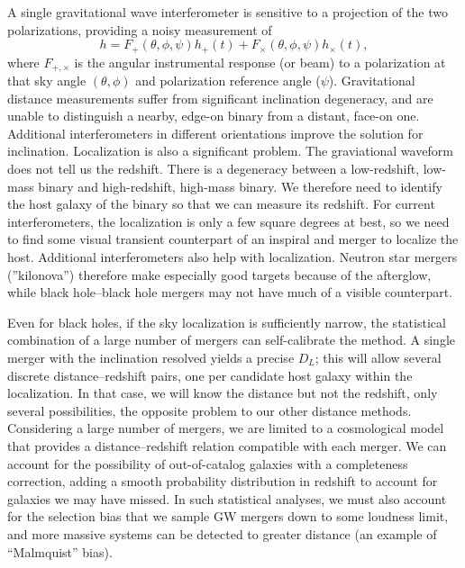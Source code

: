 A single gravitational wave interferometer is sensitive to a projection of the two polarizations, providing a noisy measurement of 
\begin{equation}
  h = F_+(\theta,\phi,\psi) h_+(t) + F_\times(\theta,\phi,\psi) h_\times(t),
\end{equation}
where $F_{+,\times}$ is the angular instrumental response (or beam) to a polarization at that sky angle $(\theta,\phi)$ and polarization reference angle ($\psi$).  Gravitational distance measurements suffer from significant inclination degeneracy, and are unable to distinguish a nearby, edge-on binary from a distant, face-on one.  Additional interferometers in different orientations improve the solution for inclination.   Localization is also a significant problem.  The graviational waveform does not tell us the redshift.  There is a degeneracy between a low-redshift, low-mass binary and high-redshift, high-mass binary.  We therefore need to identify the host galaxy of the binary so that we can measure its redshift.  For current interferometers, the localization is only a few square degrees at best, so we need to find some visual transient counterpart of an inspiral and merger to localize the host.  Additional interferometers also help with localization.  Neutron star mergers (''kilonova'') therefore make especially good targets because of the afterglow, while black hole--black hole mergers may not have much of a visible counterpart.

Even for black holes, if the sky localization is sufficiently narrow, the statistical combination of a large number of mergers can self-calibrate the method.  A single merger with the inclination resolved yields a precise $D_L$; this will allow several discrete distance--redshift pairs, one per candidate host galaxy within the localization.  In that case, we will know the distance but not the redshift, only several possibilities, the opposite problem to our other distance methods.  Considering a large number of mergers, we are limited to a cosmological model that provides a distance--redshift relation compatible with each merger. We can account for the possibility of out-of-catalog galaxies with a completeness correction, adding a smooth probability distribution in redshift to account for galaxies we may have missed.  In such statistical analyses, we must also account for the selection bias that we sample GW mergers down to some loudness limit, and more massive systems can be detected to greater distance (an example of ``Malmquist'' bias).

